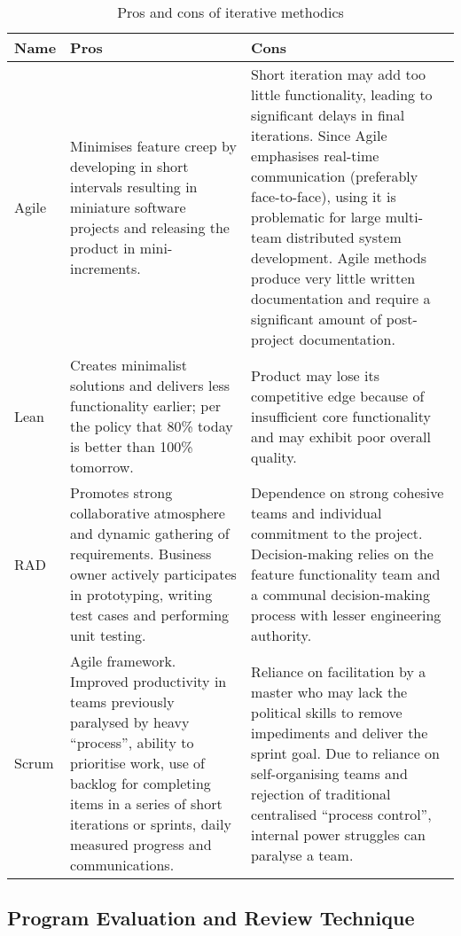 \begin{longtable}{|p{}|p{}|p{}|}
\caption{Pros and cons of iterative methodics}\label{tab:prosconsitmet} \\
	\hline
	\textbf{Name} & \textbf{Pros} & \textbf{Cons} \\
	\hline
	\endhead
	Agile 
	& Minimises feature creep by developing in short intervals resulting in miniature software projects and releasing the product in mini-increments. 
	& Short iteration may add too little functionality, leading to significant delays in final iterations. Since Agile emphasises real-time communication (preferably face-to-face), using it is problematic for large multi-team distributed system development. Agile methods produce very little written documentation and require a significant amount of post-project documentation. \\
	\hline
	Lean 
	& Creates minimalist solutions and delivers less functionality earlier; per the policy that 80\% today is better than 100\% tomorrow. 
	& Product may lose its competitive edge because of insufficient core functionality and may exhibit poor overall quality. \\
	\hline
	RAD 
	& Promotes strong collaborative atmosphere and dynamic gathering of requirements. Business owner actively participates in prototyping, writing test cases and performing unit testing. 
	& Dependence on strong cohesive teams and individual commitment to the project. Decision-making relies on the feature functionality team and a communal decision-making process with lesser engineering authority. \\
	\hline
	Scrum 
	& Agile framework. Improved productivity in teams previously paralysed by heavy ``process'', ability to prioritise work, use of backlog for completing items in a series of short iterations or sprints, daily measured progress and communications. 
	& Reliance on facilitation by a master who may lack the political skills to remove impediments and deliver the sprint goal. Due to reliance on self-organising teams and rejection of traditional centralised ``process control'', internal power struggles can paralyse a team. \\
	\hline
\end{longtable}

\subsection{Program Evaluation and Review Technique}
\label{sec:pert}

